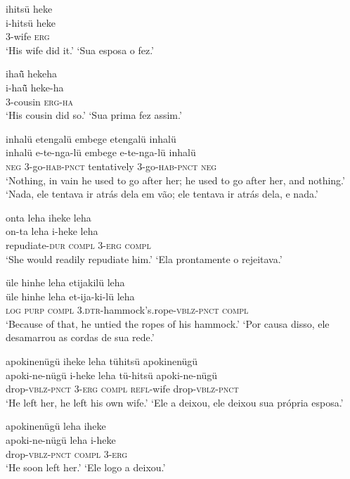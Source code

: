 \documentclass[output=paper,
modfonts,nonflat
]{langsci/langscibook}
\begin{document}
\ea  ihitsü heke\\[.3em]
\gll i-hitsü heke\\
     3-wife \textsc{erg}\\
\glt ‘His wife did it.’
\glt ‘Sua esposa o fez.’
\z 

\newpage 
\ea  ihaü̃ hekeha\\[.3em]
\gll i-haü̃ heke-ha\\
     3-cousin \textsc{erg}-\textsc{ha}\\
\glt ‘His cousin did so.’
\glt ‘Sua prima fez assim.’
\z

\ea  inhalü etengalü embege etengalü inhalü\\[.3em]
\gll inhalü e-te-nga-lü embege e-te-nga-lü inhalü\\
     \textsc{neg} 3-go-\textsc{hab}-\textsc{pnct} tentatively 3-go-\textsc{hab}-\textsc{pnct} \textsc{neg}\\
\glt ‘Nothing, in vain he used to go after her; he used to go after her, and nothing.’
\glt ‘Nada, ele tentava ir atrás dela em vão; ele tentava ir atrás dela, e nada.’
\z

\ea  onta leha iheke leha\\[.3em]
\gll on-ta leha i-heke leha\\
     repudiate-\textsc{dur} \textsc{compl} 3-\textsc{erg} \textsc{compl}\\
\glt ‘She would readily repudiate him.’
\glt ‘Ela prontamente o rejeitava.’
\z

\ea  üle hinhe leha etijakilü leha\\[.3em]
\gll üle hinhe leha et-ija-ki-lü leha\\
     \textsc{log} \textsc{purp} \textsc{compl} \textsc{3.dtr}-hammock's.rope-\textsc{vblz}-\textsc{pnct} \textsc{compl}\\
\glt ‘Because of that, he untied the ropes of his hammock.’
\glt ‘Por causa disso, ele desamarrou as cordas de sua rede.’
\z

\ea  apokinenügü iheke leha tühitsü apokinenügü\\[.3em]
\gll apoki-ne-nügü i-heke leha tü-hitsü apoki-ne-nügü\\
     drop-\textsc{vblz}-\textsc{pnct} 3-\textsc{erg} \textsc{compl} \textsc{refl}-wife drop-\textsc{vblz}-\textsc{pnct}\\
\glt ‘He left her, he left his own wife.’
\glt ‘Ele a deixou, ele deixou sua própria esposa.’
\z

\ea  apokinenügü leha iheke\\[.3em]
\gll apoki-ne-nügü leha i-heke\\
     drop-\textsc{vblz}-\textsc{pnct} \textsc{compl} 3-\textsc{erg}\\
\glt ‘He soon left her.’
\glt ‘Ele logo a deixou.’
\z
\end{document}
